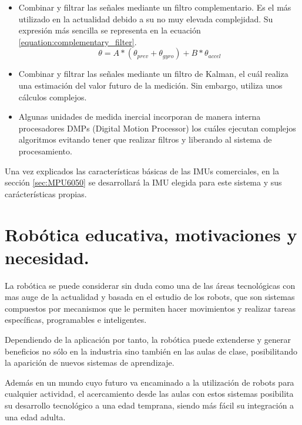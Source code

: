 \begin{itemize}
	\item Combinar y filtrar las señales mediante un filtro complementario. Es el más utilizado en la actualidad debido a su no muy elevada complejidad. Su expresión más sencilla se representa en la ecuación \ref{equation:complementary_filter}.
	\begin{equation} \label{equation:complementary_filter}
	\theta = A * (\theta_{prev}+\theta_{gyro}) + B * \theta_{accel}
	\end{equation}
	\item Combinar y filtrar las señales mediante un filtro de Kalman, el cuál realiza una estimación del valor futuro de la medición. Sin embargo, utiliza unos cálculos complejos. 
	\item Algunas unidades de medida inercial incorporan de manera interna procesadores DMPs (Digital Motion Processor) los cuáles ejecutan complejos algoritmos evitando tener que realizar filtros y liberando al sistema de procesamiento.
\end{itemize}



Una vez explicados las características básicas de las IMUs comerciales, en la sección \ref{sec:MPU6050} se desarrollará la IMU elegida para este sistema y sus carácterísticas propias.

\section{Robótica educativa, motivaciones y necesidad.}

La robótica se puede considerar sin duda como una de las áreas tecnológicas con mas auge de la actualidad y basada en el estudio de los robots, que son sistemas compuestos por mecanismos que le permiten hacer movimientos y realizar tareas específicas, programables e inteligentes. \newline

Dependiendo de la aplicación por tanto, la robótica puede extenderse y generar beneficios no sólo en la industria sino también en las aulas de clase, posibilitando la aparición de nuevos sistemas de aprendizaje.\newline

Además en un mundo cuyo futuro va encaminado a la utilización de robots para cualquier actividad, el acercamiento desde las aulas con estos sistemas posibilita su desarrollo tecnológico a una edad temprana, siendo más fácil su integración a una edad adulta.\newline

